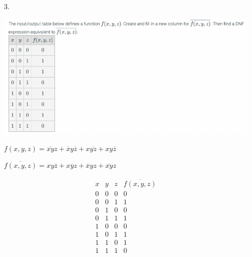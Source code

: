 \documentclass[letterpaper,11pt]{article}
\begin{document}
\begin{enumerate}
    \newpage
    \item[3.] 
    \item[] \includegraphics[scale=0.95]{question3.png}
    \item[] 
    $f(x,y,z) = \overline{xy}z + \overline{x}y\overline{z} + x\overline{yz} + xy\overline{z}$
    \item[]
    $\overline{f(x,y,z)} = xy\overline{z} + x\overline{y}z + \overline{x}yz + \overline{xy}z$

    \begin{displaymath}
        \begin{array}{|c|c|c|c|}
        x & y & z & \overline{f(x,y,z)}\\ %
        \hline %
        0 & 0 & 0 & 0\\
        0 & 0 & 1 & 1\\
        0 & 1 & 0 & 0\\
        0 & 1 & 1 & 1\\
        1 & 0 & 0 & 0\\
        1 & 0 & 1 & 1\\
        1 & 1 & 0 & 1\\
        1 & 1 & 1 & 0\\
        \end{array}
    \end{displaymath}


\end{enumerate}
\end{document}
